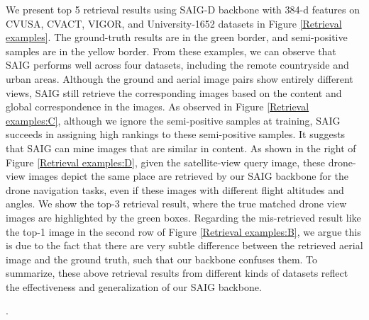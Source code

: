 \documentclass[sn-basic,iicol]{sn-jnl}
\theoremstyle{thmstyletwo}\newtheorem{example}{Example}\newtheorem{remark}{Remark}
\theoremstyle{thmstylethree}\newtheorem{definition}{Definition}
\begin{document}
We present top 5 retrieval results using SAIG-D backbone with 384-d features on CVUSA, CVACT, VIGOR, and University-1652 datasets in Figure \ref{Retrieval examples}. The ground-truth results are in the green border, and semi-positive samples are in the yellow border. From these examples, we can observe that SAIG performs well across four datasets, including the remote countryside and urban areas. Although the ground and aerial image pairs show entirely different views, SAIG still retrieve the corresponding images based on the content and global correspondence in the images. As observed in Figure \ref{Retrieval examples:C}, although we ignore the semi-positive samples at training, SAIG succeeds in assigning high rankings to these semi-positive samples. It suggests that SAIG can mine images that are similar in content. 
As shown in the right of Figure \ref{Retrieval examples:D}, given the satellite-view query image, these drone-view images depict the same place are retrieved by our SAIG backbone for the drone navigation tasks, even if these images with different flight altitudes and angles.
We show the top-3 retrieval result, where the true matched drone view images are highlighted by the green boxes. Regarding the mis-retrieved result like the top-1 image in the second row of Figure \ref{Retrieval examples:B}, we argue this is due to the fact that there are very subtle difference between the retrieved aerial image and the ground truth, such that our backbone confuses them. To summarize, these above retrieval results from different kinds of datasets reflect the effectiveness and generalization of our SAIG backbone.
\begin{figure*}
    
        \centering
        \vspace{-3mm}
        
        \centering
        \vspace{-3mm}
        
        \centering
        \vspace{-3mm}
        
        \centering
        \vspace{-3mm}
        \DeclareGraphicsExtensions.
        
        \caption{Image retrieval examples on (a) CVUSA, (b) CVACT, (c) VIGOR and (d) University-1652.}
\label{Retrieval examples}
        
		
\end{figure*}
\end{document}
